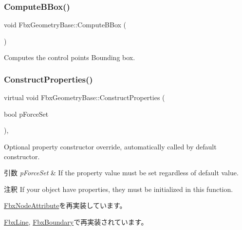 \subsubsection{\texorpdfstring{Compute\+B\+Box()}{ComputeBBox()}}
{\footnotesize\ttfamily void Fbx\+Geometry\+Base\+::\+Compute\+B\+Box (\begin{DoxyParamCaption}{ }\end{DoxyParamCaption})}

Computes the control points Bounding box. \mbox{\label{class_fbx_geometry_base_a94ee142ac1d40be3aebb4d9441431921}} 
\subsubsection{\texorpdfstring{Construct\+Properties()}{ConstructProperties()}}
{\footnotesize\ttfamily virtual void Fbx\+Geometry\+Base\+::\+Construct\+Properties (\begin{DoxyParamCaption}\item[{bool}]{p\+Force\+Set }\end{DoxyParamCaption})\hspace{0.3cm}{\ttfamily [protected]}, {\ttfamily [virtual]}}

Optional property constructor override, automatically called by default constructor. 
\begin{DoxyParams}{引数}
{\em p\+Force\+Set} & If the property value must be set regardless of default value. \\
\hline
\end{DoxyParams}
\begin{DoxyRemark}{注釈}
If your object have properties, they must be initialized in this function. 
\end{DoxyRemark}


\hyperlink{class_fbx_node_attribute_a042eb9949a9b9634dcc5f126e82fd04a}{Fbx\+Node\+Attribute}を再実装しています。



\hyperlink{class_fbx_line_a48df4b6cd889814d3fe7ca5bb09bcc78}{Fbx\+Line}, \hyperlink{class_fbx_boundary_acb50e021b1e9920026c975613a949537}{Fbx\+Boundary}で再実装されています。

\mbox{\label{class_fbx_geometry_base_acf13ddd2717d2f1ca4dc57b5ea0801b1}} 
